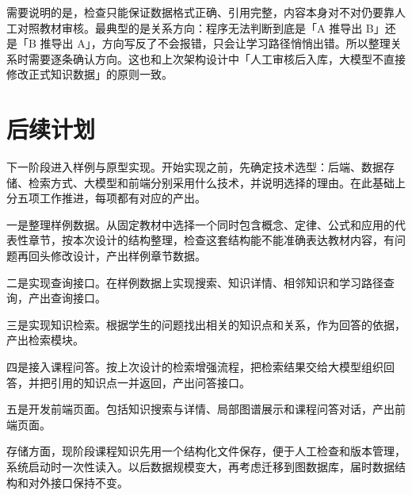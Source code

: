 \documentclass[UTF8,a4paper,zihao=-4]{ctexart}
\begin{document}
需要说明的是，检查只能保证数据格式正确、引用完整，内容本身对不对仍要靠人工对照教材审核。最典型的是关系方向：程序无法判断到底是「A 推导出 B」还是「B 推导出 A」，方向写反了不会报错，只会让学习路径悄悄出错。所以整理关系时需要逐条确认方向。这也和上次架构设计中「人工审核后入库，大模型不直接修改正式知识数据」的原则一致。

\section{后续计划}

下一阶段进入样例与原型实现。开始实现之前，先确定技术选型：后端、数据存储、检索方式、大模型和前端分别采用什么技术，并说明选择的理由。在此基础上分五项工作推进，每项都有对应的产出。

一是整理样例数据。从固定教材中选择一个同时包含概念、定律、公式和应用的代表性章节，按本次设计的结构整理，检查这套结构能不能准确表达教材内容，有问题再回头修改设计，产出样例章节数据。

二是实现查询接口。在样例数据上实现搜索、知识详情、相邻知识和学习路径查询，产出查询接口。

三是实现知识检索。根据学生的问题找出相关的知识点和关系，作为回答的依据，产出检索模块。

四是接入课程问答。按上次设计的检索增强流程，把检索结果交给大模型组织回答，并把引用的知识点一并返回，产出问答接口。

五是开发前端页面。包括知识搜索与详情、局部图谱展示和课程问答对话，产出前端页面。

存储方面，现阶段课程知识先用一个结构化文件保存，便于人工检查和版本管理，系统启动时一次性读入。以后数据规模变大，再考虑迁移到图数据库，届时数据结构和对外接口保持不变。
\end{document}
